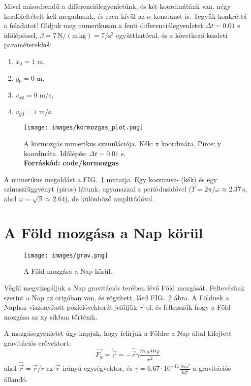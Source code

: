 \documentclass[%
 reprint,onecolumn,
 amsmath,amssymb,
 aps,
]{revtex4-2}
\begin{document}
Mivel másodrendű a differenciálegyenletünk, és két koordinátánk van, négy kezdőfeltételt kell megadnunk, és ezen kívül az $\alpha$ konstanst is.
Tegyük konkréttá a feladatot!
Oldjuk meg numerikusan a fenti differenciálegyenletet 
$\Delta{t} = 0.01$ s időlépéssel, 
$\beta = 7 \, \text{N}/ (\text{m}\, \text{kg}) = 7 /\text{s}^2$ 
együtthatóval, 
és a következő kezdeti paraméterekkel:
\begin{enumerate}
    \item $x_{0} = 1$ m,
    \item $y_{0} = 0$ m,
    \item $v_{x0} = 0$ m/s,
    \item $v_{y0} = 1$ m/s.
\end{enumerate}

\begin{figure}[h]
    \centering
    \texttt{[image: images/kormozgas\_plot.png]}
    \caption{A körmozgás numerikus szimulációja. Kék: x koordináta.
    Piros: y koordináta. Időlépés: $\Delta t = 0.01$ s. \\
    \bf{Forráskód: code/kormozgas}
    \label{fig:rezgomozgaseredmeny}}
\end{figure}

A numerikus megoldást a FIG.~\ref{fig:rezgomozgaseredmeny} mutatja. 
Egy koszinusz- (kék) és egy szinuszfüggvényt (piros) látunk, 
ugyanazzal a periódusidővel
($T = 2\pi / \omega \approx 2.37 \, \text{s}$, 
ahol $\omega = \sqrt{\beta} \approx 2.64$),
de különböző amplitúdóval. 







\section{A Föld mozgása a Nap körül}


\begin{figure}[h]
    \centering
    \texttt{[image: images/grav.png]}
    \caption{A Föld mozgása a Nap körül.}
    \label{fig:napfold}
\end{figure}

Végül megvizsgáljuk a Nap gravitációs terében lévő Föld mozgását. 
Feltevésünk szerint a Nap az origóban van, és rögzített, 
lásd FIG.~\ref{fig:napfold} ábra. 
A Földnek a Naphoz viszonyított pozícióvektorát jelöljük $\vec{r}$-el,
és feltesszük hogy a Föld mozgása az xy síkban történik.

A mozgásegyenletet úgy kapjuk, hogy felírjuk a Földre a Nap által
kifejtett gravitációs erővektort:
\begin{equation}
    \vec{F_{g}} = \ddot{\vec{r}} = - \hat{\vec{r}} \gamma \frac{m_{N}m_{F}}{r^{2}}
\end{equation}
ahol $\hat{\vec{r}} = \vec{r}/r$ az $\vec{r}$ irányú egységvektor,
és $\gamma = 6.67 \cdot 10^{-11} \frac{Nm^2}{kg^2}$ a gravitációs állandó.
\end{document}
